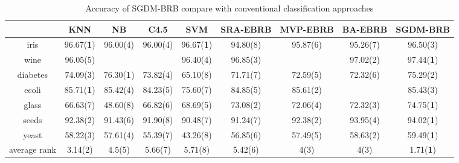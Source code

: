 \documentclass{ieeeaccess}
\begin{document}
\begin{table}
    \caption{Accuracy of SGDM-BRB compare with conventional classification approaches}
    \centering
    \label{tab5}
    \begin{tabular}{|c|c|c|c|c|c|c|c|c|}
        \hline
                     & KNN               & NB                & C4.5     & SVM               & SRA-EBRB & MVP-EBRB & BA-EBRB  & SGDM-BRB          \\
        \hline
        iris         & 96.67(\textbf{1}) & 96.00(4)          & 96.00(4) & 96.67(\textbf{1}) & 94.80(8) & 95.87(6) & 95.26(7) & 96.50(3)          \\
        wine         & 96.05(5)          &                   &          & 96.40(4)          & 96.85(3) &          & 97.02(2) & 97.44(\textbf{1}) \\
        diabetes     & 74.09(3)          & 76.30(\textbf{1}) & 73.82(4) & 65.10(8)          & 71.71(7) & 72.59(5) & 72.32(6) & 75.29(2)          \\
        ecoli        & 85.71(\textbf{1}) & 85.42(4)          & 84.23(5) & 75.60(7)          & 84.85(5) & 85.61(2) &          & 85.43(3)          \\
        glass        & 66.63(7)          & 48.60(8)          & 66.82(6) & 68.69(5)          & 73.08(2) & 72.06(4) & 72.32(3) & 74.75(\textbf{1}) \\
        seeds        & 92.38(2)          & 91.43(6)          & 91.90(8) & 90.48(7)          & 91.24(7) & 92.38(2) & 93.95(4) & 94.02(\textbf{1}) \\
        yeast        & 58.22(3)          & 57.61(4)          & 55.39(7) & 43.26(8)          & 56.85(6) & 57.49(5) & 58.63(2) & 59.49(\textbf{1}) \\
        \hline
        average rank & 3.14(2)           & 4.5(5)            & 5.66(7)  & 5.71(8)           & 5.42(6)  & 4(3)     & 4(3)     & 1.71(\textbf{1})  \\
        \hline
    \end{tabular}
\end{table}
\end{document}
